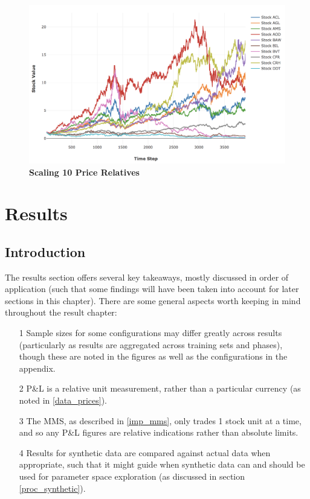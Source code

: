 \documentclass[a4paper,11pt,oneside]{article}
\theoremstyle{plain}
\theoremstyle{definition}
\begin{document}
	\begin{figure}[H]
		\centering
		\includegraphics[scale=0.45]{images/results/prices/scaling10_prices.png} 
		\caption[Scaling 10 Prices]{\textbf{Scaling 10 Price Relatives}}
		\label{figure-scaling0_prices}
	\end{figure}
	
	
	
	
	
	
	
	
	
	
	\newpage
	\section{Results}\label{Results}
	\subsection{Introduction}
	
	The results section offers several key takeaways, mostly discussed in order of application (such that some findings will have been taken into account for later sections in this chapter). There are some general aspects worth keeping in mind throughout the result chapter:
	\begin{itemize}
		\item[1] Sample sizes for some configurations may differ greatly across results (particularly as results are aggregated across training sets and phases), though these are noted in the figures as well as the configurations in the appendix.
		\item[2] P\&L is a relative unit measurement, rather than a particular currency (as noted in \ref{data_prices}).
		\item[3] The MMS, as described in \ref{imp_mms}, only trades 1 stock unit at a time, and so any P\&L figures are relative indications rather than absolute limits.
		\item[4]  Results for synthetic data are compared against actual data when appropriate, such that it might guide when synthetic data can and should be used for parameter space exploration (as discussed in section \ref{proc_synthetic}).
	\end{itemize}
	
\end{document}
